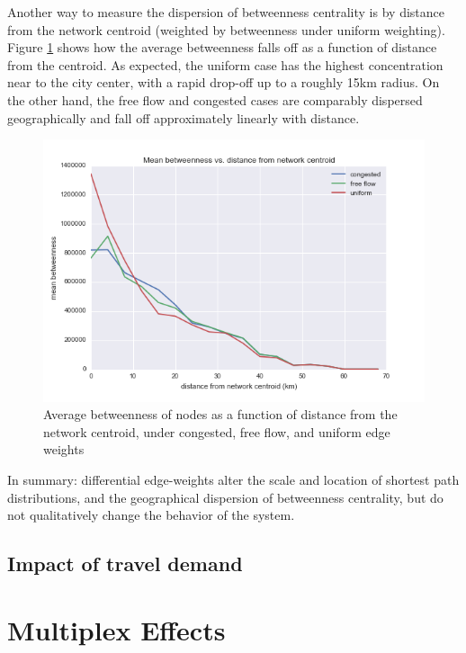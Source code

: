 \documentclass[english]{scrartcl}
\begin{document}
			Another way to measure the dispersion of betweenness centrality is by distance from the network centroid (weighted by betweenness under uniform weighting). Figure \ref{fig:4} shows how the average betweenness falls off as a function of distance from the centroid. As expected, the uniform case has the highest concentration near to the city center, with a rapid drop-off up to a roughly 15km radius. On the other hand, the free flow and congested cases are comparably dispersed geographically and fall off approximately linearly with distance. 
			\begin{figure}
				\centering
					\includegraphics[width = \textwidth]{betweenness_dist.png}
				\caption{Average betweenness of nodes as a function of distance from the network centroid, under congested, free flow, and uniform edge weights}
				\label{fig:4}
			\end{figure}
			In summary: differential edge-weights alter the scale and location of shortest path distributions, and the geographical dispersion of betweenness centrality, but do not qualitatively change the behavior of the system. 

	\subsection{Impact of travel demand}

\section{Multiplex Effects}
\end{document}
